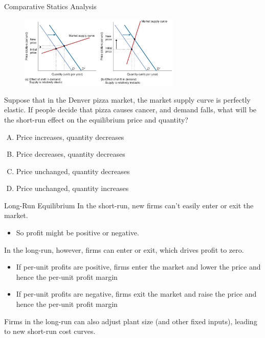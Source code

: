 \documentclass[11pt,t]{beamer}
\begin{document}
\begin{frame}{Comparative Statics Analysis}
  \begin{figure}
    \includegraphics[width=290px]{figures/fig9_10.jpg}
  \end{figure}
\end{frame}

\begin{frame}{}
  Suppose that in the Denver pizza market, the market supply curve is perfectly elastic. If people decide that pizza causes cancer, and demand falls, what will be the short-run effect on the equilibrium price and quantity?

  \medskip
  \begin{enumerate}[A)]
    \item Price increases, quantity decreases
    \item Price decreases, quantity decreases
    \item Price unchanged, quantity decreases
    \item Price unchanged, quantity increases
  \end{enumerate}
\end{frame}

\begin{frame}{Long-Run Equilibrium}
  In the short-run, new firms can't easily enter or exit the market.

  \begin{itemize}
    \item So profit might be positive or negative.
  \end{itemize}

  \medskip\pause
  In the long-run, however, firms can enter or exit, which drives profit to zero.

  \begin{itemize}
    \item If per-unit profits are positive, firms enter the market and lower the price and hence the per-unit profit margin
    \item If per-unit profits are negative, firms exit the market and raise the price and hence the per-unit profit margin
  \end{itemize}

  \medskip\pause
  Firms in the long-run can also adjust plant size (and other fixed inputs), leading to new short-run cost curves.
\end{frame}
\end{document}
